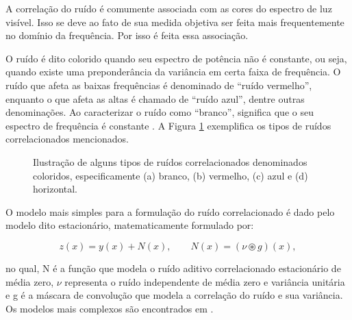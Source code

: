 A correlação do ruído é comumente associada com as cores do espectro de luz visível. Isso se deve ao fato de sua medida objetiva ser feita mais frequentemente no domínio da frequência. Por isso é feita essa associação. 

O ruído é dito colorido quando seu espectro de potência não é constante, ou seja, quando existe uma preponderância da variância em certa faixa de frequência. O ruído que afeta as baixas frequências é denominado de ``ruído vermelho'', enquanto o que afeta as altas é chamado de ``ruído azul'', dentre outras denominações. Ao caracterizar o ruído como ``branco'', significa que o seu espectro de frequência é constante \cite{marshall2017handbook,bertalmiodenoising2018}. A Figura \ref{fig:imgCapRuidoColoredNoise} exemplifica os tipos de ruídos correlacionados mencionados.


\begin{figure}[H]
	\centering
	
	\caption{Ilustração de alguns tipos de ruídos correlacionados denominados coloridos, especificamente (a) branco, (b) vermelho, (c) azul e (d) horizontal.}
	
	\hfil
	\hfil
	\hfil
	
	\label{fig:imgCapRuidoColoredNoise}
\end{figure}


O modelo mais simples para a formulação do ruído correlacionado é dado pelo modelo dito estacionário, matematicamente formulado por:

\begin{equation}
z(x) =  y(x) + N(x), \qquad N(x) = (\nu\circledast g)(x),
\label{eq:eqCapRuidoCorrelatedNoiseStationary}
\end{equation}

\noindent no qual, N é a função que modela o ruído aditivo correlacionado estacionário de média zero, $\nu$ representa o ruído independente de média zero e variância unitária e g é a máscara de convolução que modela a correlação do ruído e sua variância. Os modelos mais complexos são encontrados em .





      


